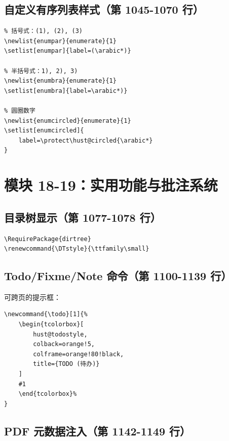 \documentclass[linux]{hustreport}
\begin{document}
\subsection{自定义有序列表样式（第 1045-1070 行）}

\begin{verbatim}
% 括号式：(1), (2), (3)
\newlist{enumpar}{enumerate}{1}
\setlist[enumpar]{label=(\arabic*)}

% 半括号式：1), 2), 3)
\newlist{enumbra}{enumerate}{1}
\setlist[enumbra]{label=\arabic*)}

% 圆圈数字
\newlist{enumcircled}{enumerate}{1}
\setlist[enumcircled]{
    label=\protect\hust@circled{\arabic*}
}
\end{verbatim}

\newpage
\section{模块 18-19：实用功能与批注系统}

\subsection{目录树显示（第 1077-1078 行）}

\begin{verbatim}
\RequirePackage{dirtree}
\renewcommand{\DTstyle}{\ttfamily\small}
\end{verbatim}

\subsection{Todo/Fixme/Note 命令（第 1100-1139 行）}

可跨页的提示框：

\begin{verbatim}
\newcommand{\todo}[1]{%
    \begin{tcolorbox}[
        hust@todostyle,
        colback=orange!5,
        colframe=orange!80!black,
        title={TODO (待办)}
    ]
    #1
    \end{tcolorbox}%
}
\end{verbatim}

\subsection{PDF 元数据注入（第 1142-1149 行）}
\end{document}

